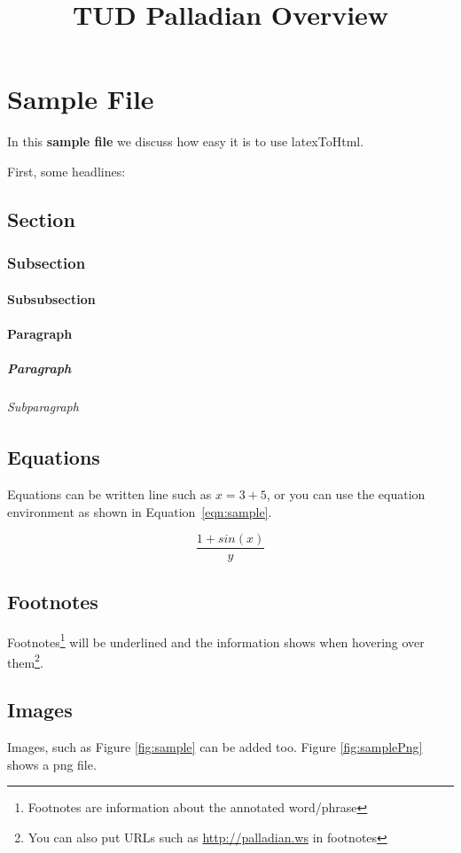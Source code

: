 \documentclass[a4paper,twoside]{book}      %
\begin{document}
\title{TUD Palladian Overview}

\chapter{Sample File}
In this \textbf{sample file} we discuss how easy it is to use latexToHtml.

First, some headlines:

\section{Section}
\subsection{Subsection}
\subsubsection{Subsubsection}
\subsubsection{Paragraph}
\paragraph{Paragraph}
\subparagraph{Subparagraph}

\label{sec:equation}
\section{Equations} 

Equations can be written line such as $x = 3 + 5$, or you can use the equation environment as shown in Equation~\ref{eqn:sample}.

\begin{equation}
\label{eqn:sample}
\frac{1+sin(x)}{y}
\end{equation}

\thiswontshow

\section{Footnotes}  
Footnotes\footnote{Footnotes are information about the annotated word/phrase} will be underlined and the information shows when hovering over them\footnote{You can also put URLs such as \url{http://palladian.ws} in footnotes}.

\section{Images}
Images, such as Figure \ref{fig:sample} can be added too. Figure \ref{fig:samplePng} shows a png file. 
\end{document}
